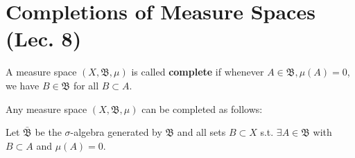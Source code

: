 \section{Completions of Measure Spaces (Lec. 8)}
\begin{definition}
    A measure space \((X,\mathfrak{B}, \mu)\) is called \textbf{complete} if whenever \(A\in\mathfrak{B}, \mu(A)=0\), we have
    \(B\in\mathfrak{B}\) for all \(B\subset A\).
\end{definition}

Any measure space \((X, \mathfrak{B},\mu)\) can be completed as follows:

Let \(\bar{\mathfrak{B}}\) be the \(\sigma\)-algebra generated by \(\mathfrak{B}\) and all sets \(B\subset X\) s.t. \(\exists A\in\mathfrak{B}\)
with \(B\subset A\) and \(\mu(A) = 0\).

